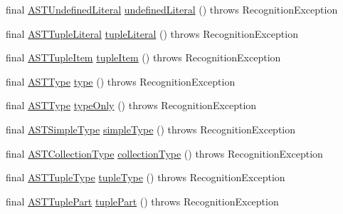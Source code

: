 \begin{DoxyCompactItemize}
\item 
final \hyperlink{classorg_1_1tzi_1_1use_1_1parser_1_1ocl_1_1_a_s_t_undefined_literal}{A\-S\-T\-Undefined\-Literal} \hyperlink{classorg_1_1tzi_1_1use_1_1parser_1_1testsuite_1_1_test_suite_parser_af4d1750da14232343d83d474316e9f12}{undefined\-Literal} ()  throws Recognition\-Exception 
\item 
final \hyperlink{classorg_1_1tzi_1_1use_1_1parser_1_1ocl_1_1_a_s_t_tuple_literal}{A\-S\-T\-Tuple\-Literal} \hyperlink{classorg_1_1tzi_1_1use_1_1parser_1_1testsuite_1_1_test_suite_parser_a938ecf9677e3311cd8ba8579487f3054}{tuple\-Literal} ()  throws Recognition\-Exception 
\item 
final \hyperlink{classorg_1_1tzi_1_1use_1_1parser_1_1ocl_1_1_a_s_t_tuple_item}{A\-S\-T\-Tuple\-Item} \hyperlink{classorg_1_1tzi_1_1use_1_1parser_1_1testsuite_1_1_test_suite_parser_a0f55ea22aa237e5f70a20626ac18a301}{tuple\-Item} ()  throws Recognition\-Exception 
\item 
final \hyperlink{classorg_1_1tzi_1_1use_1_1parser_1_1ocl_1_1_a_s_t_type}{A\-S\-T\-Type} \hyperlink{classorg_1_1tzi_1_1use_1_1parser_1_1testsuite_1_1_test_suite_parser_a4a137ee0098e9566f0ed92b2fd8684a8}{type} ()  throws Recognition\-Exception 
\item 
final \hyperlink{classorg_1_1tzi_1_1use_1_1parser_1_1ocl_1_1_a_s_t_type}{A\-S\-T\-Type} \hyperlink{classorg_1_1tzi_1_1use_1_1parser_1_1testsuite_1_1_test_suite_parser_a79f64d54116b23ebab7ad7dd4d6adc04}{type\-Only} ()  throws Recognition\-Exception 
\item 
final \hyperlink{classorg_1_1tzi_1_1use_1_1parser_1_1ocl_1_1_a_s_t_simple_type}{A\-S\-T\-Simple\-Type} \hyperlink{classorg_1_1tzi_1_1use_1_1parser_1_1testsuite_1_1_test_suite_parser_a2d6237d9f9c91e26abd3a0a399099231}{simple\-Type} ()  throws Recognition\-Exception 
\item 
final \hyperlink{classorg_1_1tzi_1_1use_1_1parser_1_1ocl_1_1_a_s_t_collection_type}{A\-S\-T\-Collection\-Type} \hyperlink{classorg_1_1tzi_1_1use_1_1parser_1_1testsuite_1_1_test_suite_parser_a9fe846f4a87c057714de957a3846f93b}{collection\-Type} ()  throws Recognition\-Exception 
\item 
final \hyperlink{classorg_1_1tzi_1_1use_1_1parser_1_1ocl_1_1_a_s_t_tuple_type}{A\-S\-T\-Tuple\-Type} \hyperlink{classorg_1_1tzi_1_1use_1_1parser_1_1testsuite_1_1_test_suite_parser_af70964d7f82d1096d4b748e0ddfef958}{tuple\-Type} ()  throws Recognition\-Exception 
\item 
final \hyperlink{classorg_1_1tzi_1_1use_1_1parser_1_1ocl_1_1_a_s_t_tuple_part}{A\-S\-T\-Tuple\-Part} \hyperlink{classorg_1_1tzi_1_1use_1_1parser_1_1testsuite_1_1_test_suite_parser_a09a18a72852ef9fd7be29cb89b4436e8}{tuple\-Part} ()  throws Recognition\-Exception 

\end{DoxyCompactItemize}
